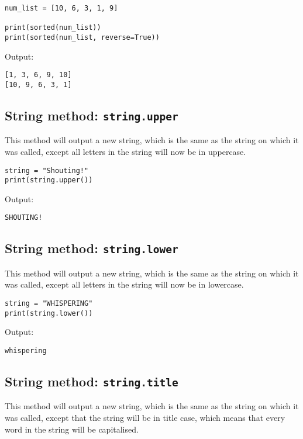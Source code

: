 \documentclass[11pt]{article}
\begin{document}
\begin{verbatim}
num_list = [10, 6, 3, 1, 9]

print(sorted(num_list))
print(sorted(num_list, reverse=True))
\end{verbatim}

 \noindent Output:

\begin{verbatim}
[1, 3, 6, 9, 10]
[10, 9, 6, 3, 1]
\end{verbatim}


 \newpage

\subsection{String method: \texttt{string.upper}}
\label{sec:org6bfc975}
This method will output a new string, which is the same as the string on which it was called, except all letters in the string will now be in uppercase.

\begin{verbatim}
string = "Shouting!"
print(string.upper())
\end{verbatim}

 \noindent Output:

\begin{verbatim}
SHOUTING!
\end{verbatim}

\subsection{String method: \texttt{string.lower}}
\label{sec:orgd5c3254}
This method will output a new string, which is the same as the string on which it was called, except all letters in the string will now be in lowercase.

\begin{verbatim}
string = "WHISPERING"
print(string.lower())
\end{verbatim}

 \noindent Output:

\begin{verbatim}
whispering
\end{verbatim}

\subsection{String method: \texttt{string.title}}
\label{sec:org4b97ef3}
This method will output a new string, which is the same as the string on which it was called, except that the string will be in title case, which means that every word in the string will be capitalised.
\end{document}

